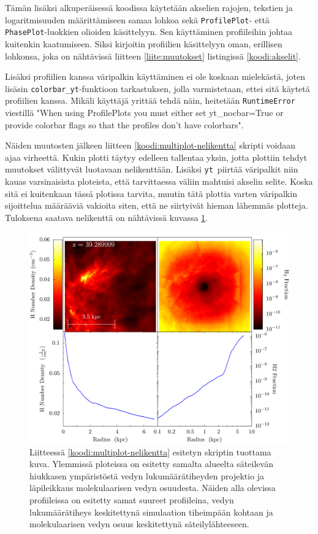 \documentclass[12pt,a4paper]{article}
\newcommand{\yt}{\texttt{yt}}
\begin{document}
Tämän lisäksi alkuperäisessä koodissa käytetään akselien rajojen, tekstien ja logaritmisuuden määrittämiseen samaa lohkoa sekä \texttt{ProfilePlot}- että \texttt{PhasePlot}-luokkien olioiden käsittelyyn. Sen käyttäminen profiileihin johtaa kuitenkin kaatumiseen. Siksi kirjoitin profiilien käsittelyyn oman, erillisen lohkonsa, joka on nähtävissä liitteen \ref{liite:muutokset} listingissä \ref{koodi:akselit}.

Lisäksi profiilien kanssa väripalkin käyttäminen ei ole koskaan mielekästä, joten lisäsin \texttt{colorbar\_yt}-funktioon tarkastuksen, jolla varmistetaan, ettei sitä käytetä profiilien kanssa. Mikäli käyttäjä yrittää tehdä näin, heitetään \texttt{RuntimeError} viestillä "When using ProfilePlots you must either set yt\_nocbar=True or provide colorbar flags so that the profiles don't have colorbars".

Näiden muutosten jälkeen liitteen \ref{koodi:multiplot-nelikentta} skripti voidaan ajaa virheettä. Kukin plotti täytyy edelleen tallentaa yksin, jotta plottiin tehdyt muutokset välittyvät luotavaan nelikenttään. Lisäksi \yt\ piirtää väripalkit niin kauas varsinaisista ploteista, että tarvittaessa väliin mahtuisi akselin selite. Koska sitä ei kuitenkaan tässä plotissa tarvita, muutin tätä plottia varten väripalkin sijoittelua määrääviä vakioita siten, että ne siirtyivät hieman lähemmäs plotteja. Tuloksena saatava nelikenttä on nähtävissä kuvassa \ref{fig:nelikentta}.

\begin{figure}
   \centering
   \includegraphics[width=\textwidth]{../kuvat/nelikko.png}
   \caption{Liitteessä \ref{koodi:multiplot-nelikentta} esitetyn skriptin tuottama kuva. Ylemmissä ploteissa on esitetty samalta alueelta säteilevän hiukkasen ympäristöstä vedyn lukumäärätiheyden projektio ja läpileikkaus molekulaarisen vedyn osuudesta. Näiden alla olevissa profiileissa on esitetty samat suureet profiileina, vedyn lukumäärätiheys keskitettynä simulaation tiheimpään kohtaan ja molekulaarisen vedyn osuus keskitettynä säteilylähteeseen.} \label{fig:nelikentta}
\end{figure}
\end{document}
